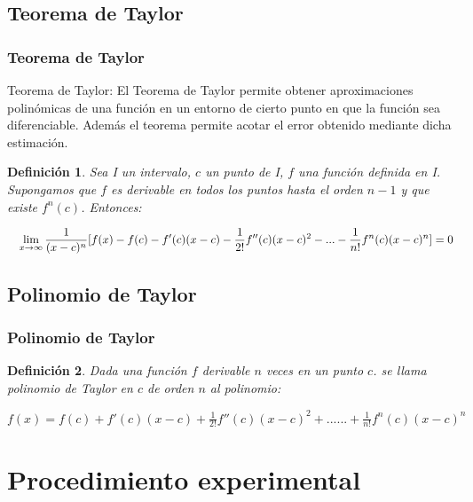 \documentclass{beamer}
\newtheorem{definicion}{Definición}
\begin{document}
\subsection{Teorema de Taylor}
\begin{frame}
\frametitle{Teorema de Taylor}

\begin{block}{Teorema de Taylor:}
El Teorema de Taylor permite obtener aproximaciones polinómicas de una función en un entorno de cierto punto en que la función sea diferenciable. 
Además el teorema permite acotar el error obtenido mediante dicha estimación. 
\end{block}
\begin{definicion}
Sea I un intervalo, $c$ un punto de I, $f$ una función definida en I. Supongamos que $f$ es derivable en todos los puntos hasta el orden
$n-1$ y que existe $f ^ n (c)$. Entonces:

\[\quad \lim_{x\to\infty} \frac{1}{(x-c)^n} [ f(x) - f(c) - f '(c) (x-c) - \frac{1}{2!} f '' (c) (x-c) ^ 2 - ...- \frac{1}{n!} f ^ n(c) (x-c) ^ n ] = \text 0\]

\end{definicion}

\end{frame}


\subsection{Polinomio de Taylor}

\begin{frame}
\frametitle{Polinomio de Taylor}
\begin{definicion}
Dada una función $f$ derivable $n$ veces en un punto $c$. se llama polinomio de Taylor en $c$ de orden $n$ al
polinomio:
\end{definicion}
\begin{block}{ }
	    $f(x) = f(c) + f '(c) (x-c) + \frac{1}{2!} f '' (c) (x-c) ^ 2 + ...... + \frac{1}{n!} f ^ n(c) (x-c) ^ n$
\end{block}
\end{frame}

\section{Procedimiento experimental}
\end{document}
